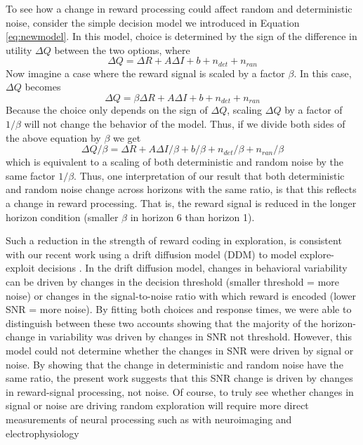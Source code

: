\documentclass[12pt]{article}
\begin{document}
{To see how a change in reward processing could affect random and deterministic noise, consider the simple decision model we introduced in Equation \ref{eq:newmodel}. In this model, choice is determined by the sign of the difference in utility $\Delta Q$ between the two options, where
\begin{equation}
	\label{eq:noise1}
	\Delta Q = 
	\Delta R + A \Delta I + b + n_{det} + n_{ran}
\end{equation}
Now imagine a case where the reward signal is scaled by a factor $\beta$.  In this case, $\Delta Q$ becomes
\begin{equation}
	\label{eq:noise2}
	\Delta Q = 
	\beta \Delta R + A \Delta I + b + n_{det} + n_{ran}
\end{equation}
Because the choice only depends on the sign of $\Delta Q$, scaling $\Delta Q$ by a factor of $1/\beta$ will not change the behavior of the model.  Thus, if we divide both sides of the above equation by $\beta$ we get
\begin{equation}
	\label{eq:noise3}
	\Delta Q / \beta = 
	\Delta R + A \Delta I / \beta + b / \beta + n_{det} / \beta + n_{ran} / \beta
\end{equation}
which is equivalent to a scaling of both deterministic and random noise by the same factor $1/\beta$. Thus, one interpretation of our result that both deterministic and random noise change across horizons with the same ratio, is that this reflects a change in reward processing. That is, the reward signal is reduced in the longer horizon condition (smaller $\beta$ in horizon 6 than horizon 1).  %

Such a reduction in the strength of reward coding in exploration, is consistent with our recent work using a drift diffusion model (DDM) to model explore-exploit decisions \citep{Feng21}. In the drift diffusion model, changes in behavioral variability can be driven by changes in the decision threshold (smaller threshold = more noise) or changes in the signal-to-noise ratio with which reward is encoded (lower SNR = more noise). By fitting both choices and response times, we were able to distinguish between these two accounts showing that the majority of the horizon-change in variability was driven by changes in SNR not threshold. However, this model could not determine whether the changes in SNR were driven by signal or noise. By showing that the change in deterministic and random noise have the same ratio, the present work suggests that this SNR change is driven by changes in reward-signal processing, not noise. Of course, to truly see whether changes in signal or noise are driving random exploration will require more direct measurements of neural processing such as with neuroimaging and electrophysiology \citep{Tomov20, Ebitz18,costa1,costa22}



}
\end{document}
